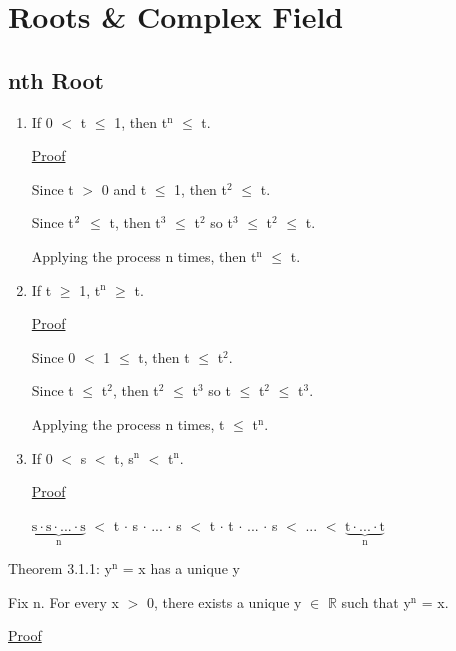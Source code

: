 \newpage
\section[Day 3: Roots and the Complex Field]{Roots \& Complex Field}

\subsection{nth Root}

	\begin{enumerate}[label=(\alph*),leftmargin=1cm]
		\item If 0 $<$ t $\leq$ 1, then t$^\text{n}$ $ \leq $ t.

			{ \color{magenta} \underline{Proof} } 
		
				Since t $>$ 0 and t $\leq$ 1, then t$^\text{2}$ $\leq$ t.

				Since t$^\text2{}$ $\leq$ t, then t$^\text{3}$ $\leq$ t$^\text{2}$
				so t$^\text{3}$ $\leq$ t$^\text{2}$ $\leq$ t.

				Applying the process n times, then t$^\text{n}$ $\leq$ t.

		\item If t $\geq$ 1, t$^\text{n}$ $ \geq $ t.

			{ \color{magenta} \underline{Proof} } 
		
				Since 0 $<$ 1 $\leq$ t, then t $\leq$ t$^\text{2}$.

				Since t $\leq$ t$^\text{2}$, then t$^\text{2}$ $\leq$ t$^\text{3}$
				so t $\leq$ t$^\text{2}$ $\leq$ t$^\text{3}$.

				Applying the process n times, t $\leq$ t$^\text{n}$.

		\item If 0 $<$ s $<$ t, s$^\text{n}$ $<$ t$^\text{n}$.

			{ \color{magenta} \underline{Proof} } 
		
				$\underbrace{\text{s} \cdot \text{s} \cdot ... \cdot \text{s}}_\text{n}$
				$<$ t $\cdot$ s $\cdot$ ... $\cdot$ s
				$<$ t $\cdot$ t $\cdot$ ... $\cdot$ s $<$ ... $<$
				$\underbrace{\text{t} \cdot ... \cdot \text{t}}_\text{n}$
	\end{enumerate}


{ \color{red} Theorem 3.1.1: y$^\text{n}$ = x has a unique y }

	\qquad Fix n. For every x $>$ 0, there exists a unique y $\in$ $ \mathbb{R} $ such that
		y$^\text{n}$ = x.

{ \color{magenta} \underline{Proof} } 

